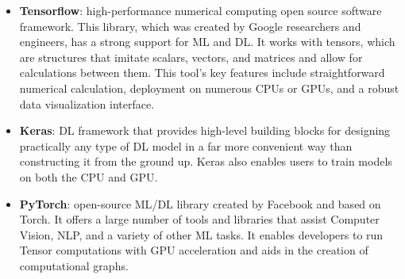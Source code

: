 \begin{itemize}
    \item \textbf{Tensorflow}: high-performance numerical computing open source software framework. This library, which was created by Google researchers and engineers, has a strong support for \gls{ML} and \gls{DL}. It works with tensors, which are structures that imitate scalars, vectors, and matrices and allow for calculations between them. This tool's key features include straightforward numerical calculation, deployment on numerous CPUs or \gls{GPU}s, and a robust data visualization interface.
    \item \textbf{Keras}: \gls{DL} framework that provides high-level building blocks for designing practically any type of \gls{DL} model in a far more convenient way than constructing it from the ground up. Keras also enables users to train models on both the CPU and \gls{GPU}.
    \item \textbf{PyTorch}: open-source \gls{ML}/\gls{DL} library created by Facebook and based on Torch. It offers a large number of tools and libraries that assist Computer Vision, \gls{NLP}, and a variety of other \gls{ML} tasks. It enables developers to run Tensor computations with \gls{GPU} acceleration and aids in the creation of computational graphs.
\end{itemize}